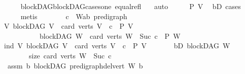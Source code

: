 \begin{isabellebody}
\ \ \ \ \isamarkupfalse%
\ blockDAG{\isachardot}{\kern0pt}blockDAG{\isacharunderscore}{\kern0pt}cases{\isacharunderscore}{\kern0pt}one\ equal{\isacharunderscore}{\kern0pt}refl\ \ \isamarkupfalse%
\ auto\isanewline
\ \ \isamarkupfalse%
\ \isamarkupfalse%
\ {\isachardoublequoteopen}P\ V{\isachardoublequoteclose}\ \isamarkupfalse%
\ bD\ cases{\isacharparenleft}{\kern0pt}{}{\isacharparenright}{\kern0pt}\isanewline
\ \ \ \ \isamarkupfalse%
\ metis\ \ \isanewline
{}\isamarkupfalse%
\ \isanewline
\ \ \isamarkupfalse%
\ c\ \ W{\isacharcolon}{\kern0pt}{\isacharcolon}{\kern0pt}{\isachardoublequoteopen}{\isacharparenleft}{\kern0pt}{\isacharprime}{\kern0pt}a{\isacharcomma}{\kern0pt}{\isacharprime}{\kern0pt}b{\isacharparenright}{\kern0pt}\ pre{\isacharunderscore}{\kern0pt}digraph{\isachardoublequoteclose}\isanewline
\ \ \isamarkupfalse%
\ {\isachardoublequoteopen}{\isacharparenleft}{\kern0pt}{\isasymAnd}V{\isachardot}{\kern0pt}\ blockDAG\ V\ {\isasymLongrightarrow}\ card\ {\isacharparenleft}{\kern0pt}verts\ V{\isacharparenright}{\kern0pt}\ {\isacharequal}{\kern0pt}\ c\ {\isasymLongrightarrow}\ P\ V{\isacharparenright}{\kern0pt}\ {\isasymLongrightarrow}\isanewline
\ \ \ \ \ \ \ \ \ \ \ blockDAG\ W\ {\isasymLongrightarrow}\ card\ {\isacharparenleft}{\kern0pt}verts\ W{\isacharparenright}{\kern0pt}\ {\isacharequal}{\kern0pt}\ Suc\ c\ {\isasymLongrightarrow}\ P\ W{\isachardoublequoteclose}\isanewline
\ \ \isamarkupfalse%
\ {\isacharminus}{\kern0pt}\isanewline
\ \ \ \ \isamarkupfalse%
\ ind{\isacharcolon}{\kern0pt}\ {\isachardoublequoteopen}{\isasymAnd}V{\isachardot}{\kern0pt}\ {\isacharparenleft}{\kern0pt}blockDAG\ V\ {\isasymLongrightarrow}\ card\ {\isacharparenleft}{\kern0pt}verts\ V{\isacharparenright}{\kern0pt}\ {\isacharequal}{\kern0pt}\ c\ {\isasymLongrightarrow}\ P\ V{\isacharparenright}{\kern0pt}{\isachardoublequoteclose}\isanewline
\ \ \ \ \ \ \ bD{\isacharcolon}{\kern0pt}\ {\isachardoublequoteopen}blockDAG\ W{\isachardoublequoteclose}\isanewline
\ \ \ \ \ \ \ \ size{\isacharcolon}{\kern0pt}\ {\isachardoublequoteopen}card\ {\isacharparenleft}{\kern0pt}verts\ W{\isacharparenright}{\kern0pt}\ {\isacharequal}{\kern0pt}\ Suc\ c{\isachardoublequoteclose}\isanewline
\ \ \ \ \isamarkupfalse%
\ \ assm{}{\isacharcolon}{\kern0pt}\ {\isachardoublequoteopen}{\isasymAnd}b{\isachardot}{\kern0pt}\ blockDAG\ {\isacharparenleft}{\kern0pt}pre{\isacharunderscore}{\kern0pt}digraph{\isachardot}{\kern0pt}del{\isacharunderscore}{\kern0pt}vert\ W\ b{\isacharparenright}{\kern0pt}\ \isanewline

\end{isabellebody}
